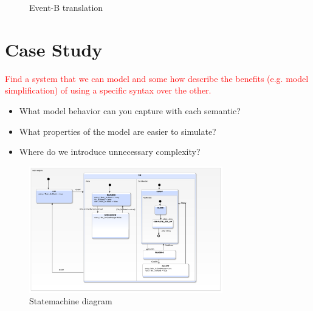 \documentclass{easychair}
\begin{document}
\begin{figure}[tbp!]
  \caption{Event-B translation} 
  \label{fig:event-b}
\end{figure}








\section{Case Study}
\label{sect:caseS}

\textcolor{red}{Find a system that we can model and some how describe the benefits 
(e.g. model simplification) of using a specific syntax over the other.}
	\begin{itemize}
		\item What model behavior can you capture with each semantic?
		\item What properties of the model are easier to simulate?
		\item Where do we introduce unnecessary complexity?
	\end{itemize}	

\begin{figure}[]
  \begin{centering}
  \includegraphics[width=0.75\textwidth]{caseStudy/TurnstileSimpleModel}
  \caption{Statemachine diagram}
  \label{fig:Statemachine}
  \end{centering}
\end{figure} 
\end{document}
